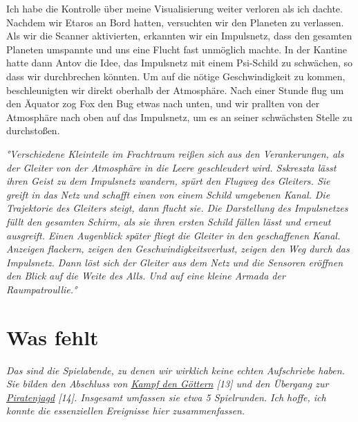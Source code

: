 \documentclass[11pt]{article}
\begin{document}
Ich habe die Kontrolle über meine Visualisierung weiter verloren als ich
dachte. Nachdem wir Etaros an Bord hatten, versuchten wir den Planeten
zu verlassen. Als wir die Scanner aktivierten, erkannten wir ein
Impulsnetz, dass den gesamten Planeten umspannte und uns eine Flucht
fast unmöglich machte. In der Kantine hatte dann Antov die Idee, das
Impulsnetz mit einem Psi-Schild zu schwächen, so dass wir durchbrechen
könnten. Um auf die nötige Geschwindigkeit zu kommen, beschleunigten wir
direkt oberhalb der Atmosphäre. Nach einer Stunde flug um den Äquator
zog Fox den Bug etwas nach unten, und wir prallten von der Atmosphäre
nach oben auf das Impulsnetz, um es an seiner schwächsten Stelle zu
durchstoßen.

\emph{°Verschiedene Kleinteile im Frachtraum reißen sich aus den
Verankerungen, als der Gleiter von der Atmosphäre in die Leere
geschleudert wird. Sskreszta lässt ihren Geist zu dem Impulsnetz
wandern, spürt den Flugweg des Gleiters. Sie greift in das Netz und
schafft einen von einem Schild umgebenen Kanal. Die Trajektorie des
Gleiters steigt, dann flucht sie. Die Darstellung des Impulsnetzes füllt
den gesamten Schirm, als sie ihren ersten Schild fällen lässt und erneut
ausgreift. Einen Augenblick später fliegt die Gleiter in den
geschaffenen Kanal. Anzeigen flackern, zeigen den
Geschwindigkeitsverlust, zeigen den Weg durch das Impulsnetz. Dann löst
sich der Gleiter aus dem Netz und die Sensoren eröffnen den Blick auf
die Weite des Alls. Und auf eine kleine Armada der Raumpatroullie.°}

\section{Was fehlt}

\emph{Das sind die Spielabende, zu denen wir wirklich keine echten
Aufschriebe haben. Sie bilden den Abschluss von
\href{http://1w6.org/deutsch/kampagnen/waechter-der-zeit/sskresztas-gedaechtniskristall/kampf-den-goettern}{Kampf
den Göttern} {[}13{]} und den Übergang zur
\href{http://1w6.org/deutsch/waechter-der-zeit/aufzeichnungen/sskreszta/piratenjagd}{Piratenjagd}
{[}14{]}. Insgesamt umfassen sie etwa 5 Spielrunden. Ich hoffe, ich
konnte die essenziellen Ereignisse hier zusammenfassen.}
\end{document}
